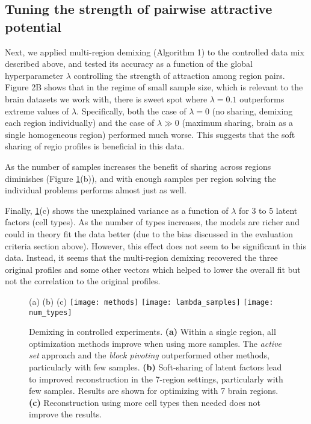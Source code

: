 \subsection{Tuning the strength of pairwise attractive potential}
Next, we applied multi-region demixing (Algorithm 1) to the controlled data mix described above, and tested its accuracy as a function of the global hyperparameter $\lambda$ controlling the strength of attraction among region pairs. Figure 2B shows that in the regime of small sample size, which is relevant to the brain datasets we work with, there is sweet spot where $\lambda=0.1$ outperforms extreme values of $\lambda$. Specifically, both the case of $\lambda=0$ (no sharing, demixing each region individually) and the case of $\lambda \gg0$ (maximum sharing, brain as a single homogeneous region) performed much worse. This suggests that the soft sharing of regio profiles is beneficial in this data.  

As the number of samples increases the benefit of sharing across regions diminishes (Figure \ref{fig:controlled_exp}(b)), and with enough samples per region solving the individual problems performs almost just as well. 

Finally, \ref{fig:controlled_exp}(c) shows the unexplained variance as a function of $\lambda$ for 3 to 5 latent factors (cell types). As the number of types increases, the models are richer and could in theory fit the data better (due to the bias discussed in the evaluation criteria section above). However, this effect does not seem to be significant in this data.  Instead, it seems that the multi-region demixing recovered the three original profiles and some other vectors which helped to lower the overall fit but not the correlation to the original profiles. 
\begin{figure}[!hbt]
   (a) \hspace{120pt}(b) \hspace{120pt}(c) \hspace{190pt}
   \centering
     \texttt{[image: methods]}
     \texttt{[image: lambda\_samples]}
     \texttt{[image: num\_types]}
    \caption{Demixing in controlled experiments. 
    {\bf{(a)}}  Within a single region, all optimization methods improve when using more samples. The {\em active set} approach and the {\em block pivoting} outperformed other methods, particularly with few samples. {\bf{(b)}} Soft-sharing of latent factors lead to improved reconstruction in the 7-region settings, particularly with few samples. Results are shown for optimizing with 7 brain regions. {\bf{(c)}} Reconstruction using more cell types then needed does not improve the results.} 
    \label{fig:controlled_exp}
\end{figure}

